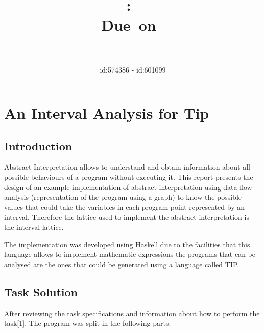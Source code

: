 \documentclass{article}
\title{
\vspace{2in}
\textmd{\textbf{\hmwkClass:\ \hmwkTitle}}\\
\normalsize\vspace{0.1in}\small{Due\ on\ \hmwkDueDate}\\
\vspace{0.1in}\large{\textit{\hmwkClassInstructor\ \hmwkClassTime}}
\vspace{3in}
}
\author{\textbf{\hmwkAuthorName} id:574386 - id:601099}
\date{} %
\begin{document}
\maketitle


\newpage
\newpage

\section{An Interval Analysis for Tip}

\subsection{Introduction}

Abstract Interpretation allows to understand and obtain information about all possible
behaviours of a program without executing it. This report presents the design of
an example implementation of abstract interpretation using data flow analysis
(representation of the program using a graph) to know the possible values that could
take the variables in each program point represented by an interval. Therefore the
lattice used to implement the abstract interpretation is the interval lattice.

The implementation was developed using Haskell due to the facilities that this language
allows to implement mathematic expressions the programs that can be analysed are the
ones that could be generated using a language called TIP.


\subsection{Task Solution}
After reviewing the task specifications and information about how to perform the
task[1]. The program was split in the following parts:

\end{document}
